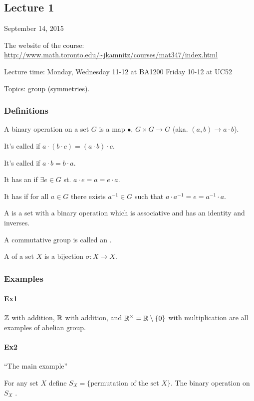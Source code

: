 \subsection{Lecture 1} September 14, 2015

The website of the course:
	\url{http://www.math.toronto.edu/~jkamnitz/courses/mat347/index.html}

Lecture time:
Monday, Wednesday 11-12 at BA1200
Friday 10-12 at UC52

Topics: group (symmetries).

\subsubsection{Definitions}
A binary operation on a set $G$ is a map $\bullet$,
	$G \times G \to G$ (aka. $(a, b) \to a \cdot b$).

It's called  if $a \cdot ( b \cdot c ) = (a \cdot b) \cdot c$.

It's called  if $a \cdot b = b \cdot a$.

It has an  if $\exists e \in G$ st. $a \cdot e = a = e \cdot a$.

It has  if for all $a \in G$ there exists $a^{-1} \in G$ such that
$a \cdot a^{-1} = e = a^{-1} \cdot a$.

A  is a set with a binary operation which is associative and has an identity and inverses.

A commutative group is called an .

A  of a set $X$ is a bijection $\sigma : X \to X$.

\subsubsection{Examples}

\paragraph{Ex1}
${\mathbb Z}$ with addition, ${\mathbb R}$ with addition, and
${\mathbb R}^\times={\mathbb R}\setminus\{0\}$ with multiplication are all examples of abelian group.

\paragraph{Ex2}
``The main example''

For any set $X$ define $S_X = \{\textrm{permutation of the set }X\}$.
The binary operation on $S_X$ .

